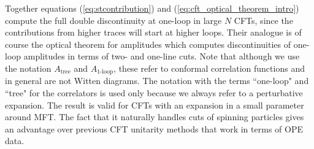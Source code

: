Together equations (\ref{eq:stcontribution}) and (\ref{eq:cft_optical_theorem_intro})
compute the full double discontinuity at one-loop in large $N$ CFTs, since the contributions from higher traces will start at higher loops.
Their analogue is of course the optical theorem for amplitudes which computes discontinuities of one-loop amplitudes in terms of two- and one-line cuts. Note that although we use the notation
$A_\text{tree}$ and $A_\text{1-loop}$, these refer to conformal correlation functions and in general are not Witten diagrams. The notation with the terms ``one-loop" and ``tree" for the correlators is used only because we always refer to a perturbative expansion. The result is valid for CFTs with an expansion in a small parameter around MFT. The fact that it naturally handles cuts of spinning particles gives an advantage over previous CFT unitarity methods that work in terms of OPE data.

